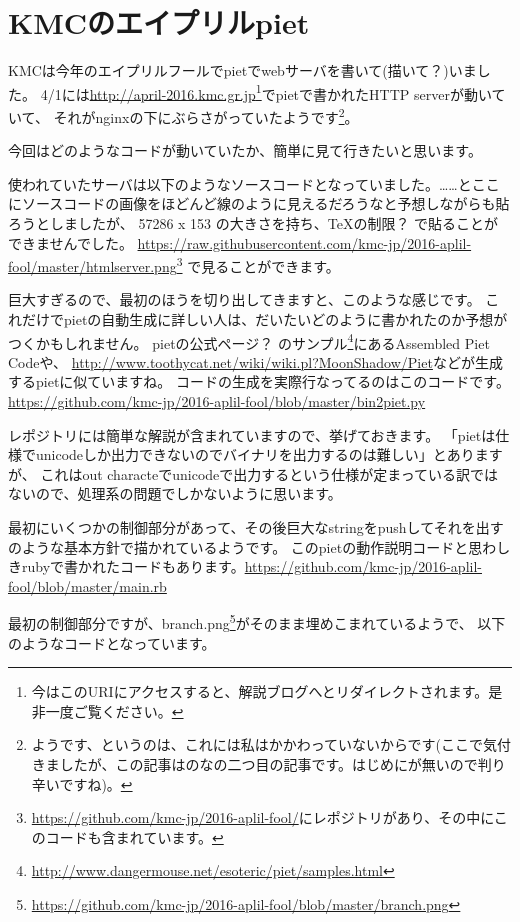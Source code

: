 \chapter[KMCのエイプリルpiet]{KMCのエイプリルpiet}

KMCは今年のエイプリルフールでpietでwebサーバを書いて(描いて？)いました。
4/1には\url{http://april-2016.kmc.gr.jp}\footnote{今はこのURIにアクセスすると、解説ブログへとリダイレクトされます。是非一度ご覧ください。}でpietで書かれたHTTP serverが動いていて、
それがnginxの下にぶらさがっていたようです\footnote{ようです、というのは、これには私はかかわっていないからです(ここで気付きましたが、この記事はのなの二つ目の記事です。はじめにが無いので判り辛いですね)。}。

今回はどのようなコードが動いていたか、簡単に見て行きたいと思います。

使われていたサーバは以下のようなソースコードとなっていました。……とここにソースコードの画像をほどんど線のように見えるだろうなと予想しながらも貼ろうとしましたが、
57286 x 153 の大きさを持ち、\TeX の制限？ で貼ることができませんでした。
\url{https://raw.githubusercontent.com/kmc-jp/2016-aplil-fool/master/htmlserver.png}\footnote{\url{https://github.com/kmc-jp/2016-aplil-fool/}にレポジトリがあり、その中にこのコードも含まれています。}
で見ることができます。

巨大すぎるので、最初のほうを切り出してきますと、このような感じです。
これだけでpietの自動生成に詳しい人は、だいたいどのように書かれたのか予想がつくかもしれません。
pietの公式ページ？ のサンプル\footnote{\url{http://www.dangermouse.net/esoteric/piet/samples.html}}にあるAssembled Piet Codeや、
\url{http://www.toothycat.net/wiki/wiki.pl?MoonShadow/Piet}などが生成するpietに似ていますね。
コードの生成を実際行なってるのはこのコードです。
\url{https://github.com/kmc-jp/2016-aplil-fool/blob/master/bin2piet.py}

レポジトリには簡単な解説が含まれていますので、挙げておきます。
「pietは仕様でunicodeしか出力できないのでバイナリを出力するのは難しい」とありますが、
これはout characteでunicodeで出力するという仕様が定まっている訳ではないので、処理系の問題でしかないように思います。

最初にいくつかの制御部分があって、その後巨大なstringをpushしてそれを出す のような基本方針で描かれているようです。
このpietの動作説明コードと思わしきrubyで書かれたコードもあります。\url{https://github.com/kmc-jp/2016-aplil-fool/blob/master/main.rb}

最初の制御部分ですが、branch.png\footnote{\url{https://github.com/kmc-jp/2016-aplil-fool/blob/master/branch.png}}がそのまま埋めこまれているようで、
以下のようなコードとなっています。

